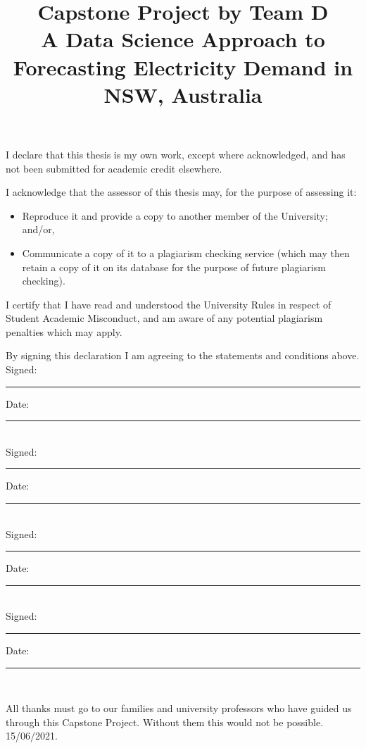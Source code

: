 \documentclass[mstat,12pt]{unswthesis}
\title{Capstone Project by Team D\\[0.5cm]A Data Science Approach to
Forecasting Electricity Demand in NSW, Australia}
\author{\Authornameonly}
\begin{document}
\beforepreface




\vskip 2pc \noindent I declare that this thesis is my
own work, except where acknowledged, and has not been submitted for
academic credit elsewhere. 

\vskip 2pc  \noindent I acknowledge that the assessor of this
thesis may, for the purpose of assessing it:
\begin{itemize}
\item Reproduce it and provide a copy to another member of the University; and/or,
\item Communicate a copy of it to a plagiarism checking service (which may then retain a copy of it on its database for the purpose of future plagiarism checking).
\end{itemize}

\vskip 2pc \noindent I certify that I have read and understood the University Rules in
respect of Student Academic Misconduct, and am aware of any potential plagiarism penalties which may 
apply.\vspace{24pt}

\vskip 2pc \noindent By signing 
this declaration I am
agreeing to the statements and conditions above.
\vskip 2pc \noindent
Signed: \rule{7cm}{0.25pt} \hfill Date: \rule{4cm}{0.25pt} \\[1cm]
Signed: \rule{7cm}{0.25pt} \hfill Date: \rule{4cm}{0.25pt} \\[1cm]
Signed: \rule{7cm}{0.25pt} \hfill Date: \rule{4cm}{0.25pt} \\[1cm]
Signed: \rule{7cm}{0.25pt} \hfill Date: \rule{4cm}{0.25pt} \\[1cm]
\vskip 1pc





{\bigskip}All thanks must go to our families and university professors
who have guided us through this Capstone Project. Without them this
would not be possible.\\[1cm] 

{\bigskip\bigskip\bigskip\noindent} 15/06/2021.



\end{document}
